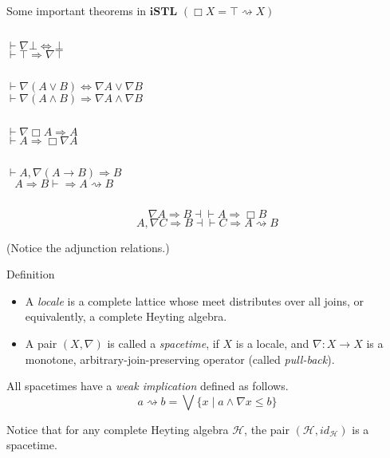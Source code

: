 \documentclass{beamer}
\begin{document}
\begin{frame}[t]{\subSTL}
	Some important theorems in $\mathbf{iSTL}$ \quad  $(\Box X = \top \rightsquigarrow X)$
	\begin{block}{}
		\begin{columns}
			\[ \vdash \nabla \bot \Leftrightarrow \bot \]
			\[ \vdash \top \Rightarrow \nabla \top \]
		\end{columns}
		\vspace{1ex}

		\begin{columns}
			\column{0.5\textwidth}
			\[ \vdash \nabla (A \vee B) \Leftrightarrow \nabla A \vee \nabla B \]
			\column{0.5\textwidth}
			\[ \vdash \nabla (A \wedge B) \Rightarrow \nabla A \wedge \nabla B \]
		\end{columns}
		\vspace{1ex}

		\begin{columns}
			\[ \vdash \nabla \Box A \Rightarrow A \]
			\[ \vdash A \Rightarrow \Box \nabla A \]
		\end{columns}
		\vspace{1ex}

		\begin{columns}
			\column{0.5\textwidth}
			\[ \vdash A, \nabla (A \rightarrow B) \Rightarrow B \]
			\column{0.5\textwidth}
			\[ A \Rightarrow B \vdash \Rightarrow A \rightsquigarrow B \]
		\end{columns}
		\[ \nabla A \Rightarrow B \dashv\vdash A \Rightarrow \Box B \]
		\[ A, \nabla C \Rightarrow B \dashv\vdash C \Rightarrow A \rightsquigarrow B \]
	\end{block}

	(Notice the adjunction relations.) 
\end{frame}

\begin{frame}{\subSemantics}
	\begin{block}{Definition}
		\begin{itemize}
			\item A \emph{locale} is a complete lattice whose meet distributes over all joins, or equivalently, a complete Heyting algebra.
			\item A pair $(X, \nabla)$ is called a \emph{spacetime}, if $X$ is a locale, and $\nabla : X \rightarrow X$ is a monotone, arbitrary-join-preserving operator (called \emph{pull-back}).
			\cite{amir}
		\end{itemize}
	\end{block}

	All spacetimes have a \emph{weak implication} defined as follows. \[a \rightsquigarrow b = \bigvee \{ x \mid a \wedge \nabla x \leq b \} \]

	Notice that for any complete Heyting algebra $\mathcal{H}$, the pair $(\mathcal{H}, id_\mathcal{H})$ is a spacetime.
\end{frame}
\end{document}
